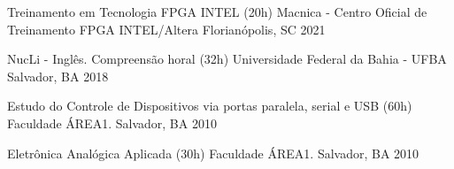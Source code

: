 

\begin{cvhonors}

\cvhonor
  {Treinamento em Tecnologia FPGA INTEL (20h)} %
  {Macnica - Centro Oficial de Treinamento FPGA INTEL/Altera} %
  {Florianópolis, SC} %
  {2021} %

  \cvhonor
    {NucLi - Inglês. Compreensão horal (32h)} %
    {Universidade Federal da Bahia - UFBA} %
    {Salvador, BA} %
    {2018} %
    

  \cvhonor
    {Estudo do Controle de Dispositivos via portas paralela, serial e USB (60h)} %
    {Faculdade ÁREA1.} %
    {Salvador, BA} %
    {2010} %

  \cvhonor
    {Eletrônica Analógica Aplicada (30h)} %
    {Faculdade ÁREA1.} %
    {Salvador, BA} %
    {2010} %

\end{cvhonors}
